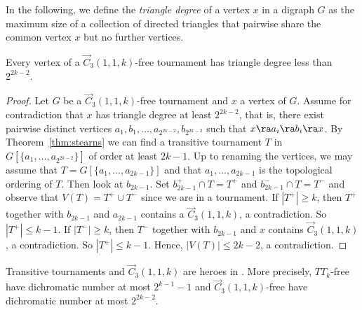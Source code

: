 In the following, we define the \emph{triangle degree} of a vertex $x$ in a digraph $G$ as the maximum size of a collection of directed triangles that pairwise share the common vertex $x$ but no further vertices.

\begin{lemma}\label{lem:bounded_triangle_degree}
Every vertex of a $\vec C_{3}(1,1,k)$-free tournament has triangle degree less than $2^{2k-2}$. 
\end{lemma}

\begin{proof}
Let $G$ be a $\vec C_{3}(1,1,k)$-free tournament and $x$ a vertex of $G$. 
Assume for contradiction that $x$ has triangle degree at least $2^{2k-2}$, that is, there exist pairwise distinct vertices $a_1, b_1, \dots, a_{2^{2k-2}}, b_{2^{2k-2}}$ such that $x \ra a_i \ra b_i \ra x$. 
By Theorem~\ref{thm:stearns} we can find a transitive tournament $T$ in $G[\{a_1, \dots, a_{2^{2k-2}}\}]$ of order at least $2k-1$. Up to renaming the vertices, we may assume that $T=G[\{a_1, \dots, a_{2k-1}\}]$ and that $a_1, \dots, a_{2k-1}$ is the topological ordering of $T$.   
Then look at $b_{2k-1}$. Set $b_{2k-1}^+ \cap T  = T^+$ and $b_{2k-1}^- \cap T = T^-$ and observe that $V(T) = T^+ \cup T^-$ since we are in a tournament. 
If $|T^+| \geq k$, then $T^+$ together with $b_{2k-1}$ and $a_{2k-1}$ contains a  $\vec C_{3}(1,1,k)$, a contradiction. So $|T^+|\leq k-1$. 
If $|T^-| \geq k$, then $T^-$ together with $b_{2k-1}$ and $x$ contains $\vec C_{3}(1,1,k)$, a contradiction. So $|T^+|\leq k-1$. Hence, $|V(T)| \leq 2k-2$, a contradiction. 
\end{proof}


\begin{theorem}
Transitive tournaments and $\vec C_{3}(1,1,k)$ are heroes in \ocgs. 
More precisely, $TT_k$-free \ocgs have dichromatic number at most $2^{k-1}-1$ and  $\vec C_{3}(1,1,k)$-free \ocgs have dichromatic number at most $2^{2k-2}$.  
\end{theorem}

